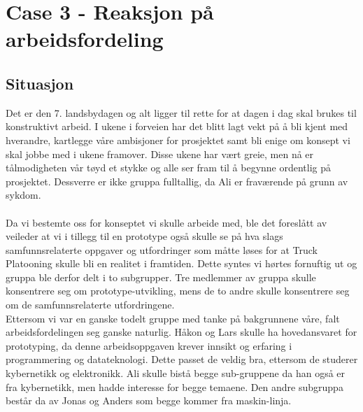 \section{Case 3 - Reaksjon på arbeidsfordeling}

\subsection*{Situasjon}
Det er den 7. landsbydagen og alt ligger til rette for at dagen i dag skal brukes til konstruktivt arbeid. I ukene i forveien har det blitt lagt vekt på å bli kjent med hverandre, kartlegge våre ambisjoner for prosjektet samt bli enige om konsept vi skal jobbe med i ukene framover. Disse ukene har vært greie, men nå er tålmodigheten vår tøyd et stykke og alle ser fram til å begynne ordentlig på prosjektet. Dessverre er ikke gruppa fulltallig, da Ali er fraværende på grunn av sykdom.\\
\\Da vi bestemte oss for konseptet vi skulle arbeide med, ble det foreslått av veileder at vi i tillegg til en prototype også skulle se på hva slags samfunnsrelaterte oppgaver og utfordringer som måtte løses for at Truck Platooning skulle bli en realitet i framtiden. Dette syntes vi hørtes fornuftig ut og gruppa ble derfor delt i to subgrupper. Tre medlemmer av gruppa skulle konsentrere seg om prototype-utvikling, mens de to andre skulle konsentrere seg om de samfunnsrelaterte utfordringene. 
\\Ettersom vi var en ganske todelt gruppe med tanke på bakgrunnene våre, falt arbeidsfordelingen seg ganske naturlig. Håkon og Lars skulle ha hovedansvaret for prototyping, da denne arbeidsoppgaven krever innsikt og erfaring i programmering og datateknologi. Dette passet de veldig bra, ettersom de studerer kybernetikk og elektronikk. Ali skulle bistå  begge sub-gruppene da han også er fra kybernetikk, men hadde interesse for begge temaene. Den andre subgruppa består da av Jonas og Anders som begge kommer fra maskin-linja.\\

